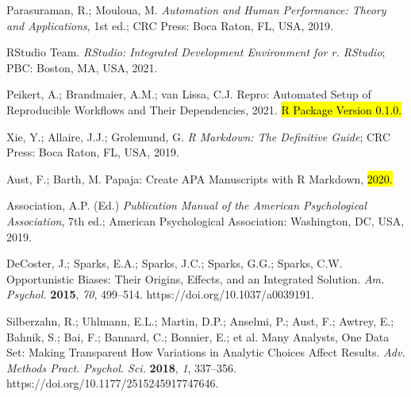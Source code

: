 \documentclass[psych,tutorial,accept,moreauthors,pdftex]{Definitions/mdpi}
\begin{document}
\begin{thebibliography}{999}
Parasuraman, R.; Mouloua, M. \emph{Automation and Human Performance: Theory and Applications}, 1st ed.; CRC Press: Boca Raton, FL, USA, 2019.


RStudio Team. \emph{RStudio: Integrated Development Environment for r. RStudio}; PBC: Boston, MA, USA, 2021.


Peikert, A.; Brandmaier, A.M.; van Lissa, C.J. Repro: Automated Setup of Reproducible Workflows and Their Dependencies, 2021. \hl{R Package Version 0.1.0.}%


Xie, Y.; Allaire, J.J.; Grolemund, G. \emph{R Markdown: The Definitive Guide}; CRC Press: Boca Raton, FL, USA, 2019.


Aust, F.; Barth, M. Papaja: Create APA Manuscripts with R Markdown, \hl{2020.}%


Association, A.P. (Ed.) \emph{Publication Manual of the American Psychological Association}, 7th ed.; American Psychological Association: Washington, DC, USA, 2019.

DeCoster, J.; Sparks, E.A.; Sparks, J.C.; Sparks, G.G.; Sparks, C.W. Opportunistic Biases: Their Origins, Effects, and an Integrated Solution. \emph{Am. Psychol.} \textbf{2015}, \emph{70}, 499–514. https://doi.org/10.1037/a0039191.

Silberzahn, R.; Uhlmann, E.L.; Martin, D.P.; Anselmi, P.; Aust, F.; Awtrey, E.; Bahnik, S.; Bai, F.; Bannard, C.; Bonnier, E.; et al. Many Analysts, One Data Set: Making Transparent How Variations in Analytic Choices Affect Results. \emph{Adv. Methods Pract. Psychol. Sci.} \textbf{2018}, \emph{1}, 337--356. https://doi.org/10.1177/2515245917747646.


\end{thebibliography}
\end{document}
